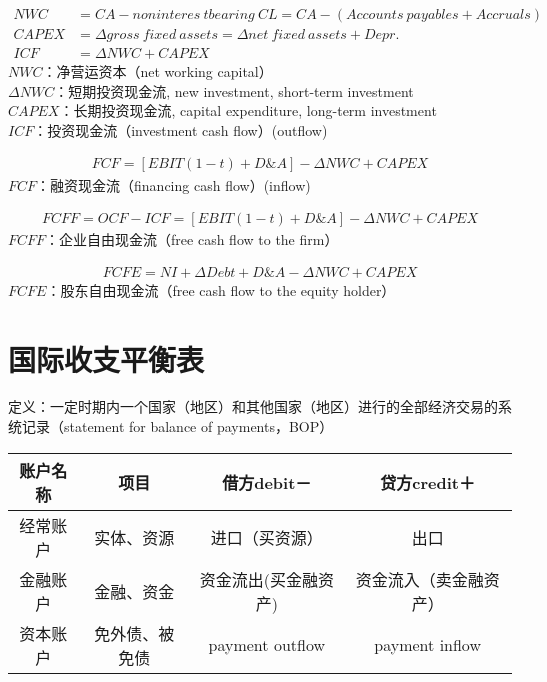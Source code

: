 \documentclass[12pt]{book}
\begin{document}
\begin{align*}
NWC   & = CA- noninteres\ tbearing\ CL = CA-(Accounts\ payables + Accruals)\\
CAPEX & = \Delta gross\ fixed\ assets =\Delta net\ fixed\ assets + Depr.\\
ICF   & = \Delta NWC + CAPEX
\end{align*}
$NWC$：净营运资本（net working capital）\\
$\Delta NWC$：短期投资现金流, new investment, short-term investment\\
$CAPEX$：长期投资现金流, capital expenditure, long-term investment\\
$ICF$：投资现金流（investment cash flow）(outflow)

\begin{gather*}
FCF = [EBIT(1-t) + D\&A ] - \Delta NWC + CAPEX
\end{gather*}
$FCF$：融资现金流（financing cash flow）(inflow)

\begin{gather*}
FCFF = OCF-ICF 
     = [EBIT(1-t)+D\&A] - \Delta NWC + CAPEX
\end{gather*}
$FCFF$：企业自由现金流（free cash flow to the firm）

\begin{gather*}
FCFE = NI+\Delta Debt + D\&A - \Delta NWC+CAPEX 
\end{gather*}
$FCFE$：股东自由现金流（free cash flow to the equity holder）


\section{国际收支平衡表}


定义：一定时期内一个国家（地区）和其他国家（地区）进行的全部经济交易的系统记录（statement for balance of payments，BOP）


\begin{tabu}{|c|c|c|c|}
    \hline
    账户名称 & 项目           & 借方debit－          & 贷方credit＋           \\\hline
    经常账户 & 实体、资源     & 进口（买资源）       & 出口                   \\\hline
    金融账户 & 金融、资金     & 资金流出(买金融资产) & 资金流入（卖金融资产） \\\hline
    资本账户 & 免外债、被免债 & payment outflow      & payment inflow         \\\hline
\end{tabu}
\end{document}
